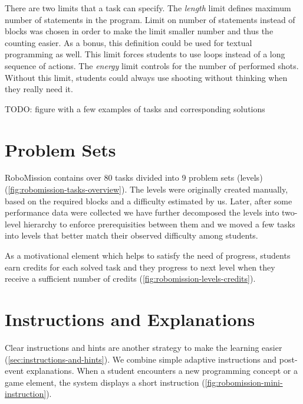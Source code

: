 There are two limits that a task can specify.
The \emph{length} limit defines maximum number of statements
in the program. Limit on number of statements instead of blocks was chosen in
order to make the limit smaller number and thus the counting easier.
As a bonus, this definition could be used for textual programming as well.
This limit forces students to use loops instead of a long sequence of
actions.
The \emph{energy} limit controls for the number
of performed shots. Without this limit, students could always use
shooting without thinking when they really need it.


TODO: figure with a few examples of tasks and corresponding solutions
\clearpage  %


\section{Problem Sets}



RoboMission contains over 80 tasks divided into 9 problem sets (levels)
(\cref{fig:robomission-tasks-overview}).
The levels were originally created manually, based on the required blocks
and a difficulty estimated by us. Later, after some performance data
were collected we have further decomposed the levels into two-level
hierarchy to enforce prerequisities between them and we moved
a few tasks into levels that better match their observed
difficulty among students.


As a motivational element which helps to satisfy the need of progress,
students earn credits for each solved task and they progress to
next level when they receive a sufficient number of credits
(\cref{fig:robomission-levels-credits}).



\section{Instructions and Explanations}

Clear instructions and hints are another strategy to make the learning easier
(\cref{sec:instructions-and-hints}).
We combine simple adaptive instructions and post-event explanations.
When a student encounters a new programming concept or a game element,
the system displays a short instruction (\cref{fig:robomission-mini-instruction}).

